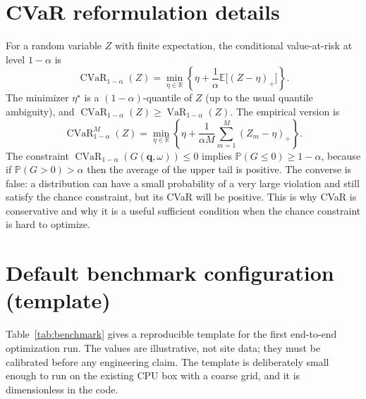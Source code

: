 \documentclass[11pt]{article}
\numberwithin{equation}{section}
\newcommand{\R}{\mathbb{R}}
\newcommand{\E}{\mathbb{E}}
\newcommand{\Prob}{\mathbb{P}}
\newcommand{\CVaR}{\operatorname{CVaR}}
\newcommand{\VaR}{\operatorname{VaR}}
\theoremstyle{plain}
\begin{document}
\section{CVaR reformulation details}
\label{app:cvar}

For a random variable $Z$ with finite expectation, the conditional
value-at-risk at level $1-\alpha$ is
\begin{equation}
\label{eq:appcvar}
\CVaR_{1-\alpha}(Z)
=\min_{\eta\in\R}\left\{
\eta+\frac{1}{\alpha}\E\bigl[(Z-\eta)_+\bigr]
\right\}.
\end{equation}
The minimizer $\eta^\star$ is a $(1-\alpha)$-quantile of $Z$ (up to the
usual quantile ambiguity), and $\CVaR_{1-\alpha}(Z)\ge\VaR_{1-\alpha}(Z)$.
The empirical version is
\begin{equation}
\label{eq:appcvarM}
\CVaR_{1-\alpha}^M(Z)
=\min_{\eta\in\R}\left\{
\eta+\frac{1}{\alpha M}\sum_{m=1}^{M}(Z_m-\eta)_+
\right\}.
\end{equation}
The constraint $\CVaR_{1-\alpha}(G(\mathbf{q},\omega))\le0$ implies
$\Prob(G\le0)\ge1-\alpha$, because if $\Prob(G>0)>\alpha$ then the average of
the upper tail is positive.  The converse is false: a distribution can have a
small probability of a very large violation and still satisfy the chance
constraint, but its CVaR will be positive.  This is why CVaR is conservative
and why it is a useful sufficient condition when the chance constraint is hard
to optimize.

\section{Default benchmark configuration (template)}
\label{app:benchmark}

Table~\ref{tab:benchmark} gives a reproducible template for the first
end-to-end optimization run.  The values are illustrative, not site data; they
must be calibrated before any engineering claim.  The template is deliberately
small enough to run on the existing CPU box with a coarse grid, and it is
dimensionless in the code.
\end{document}
